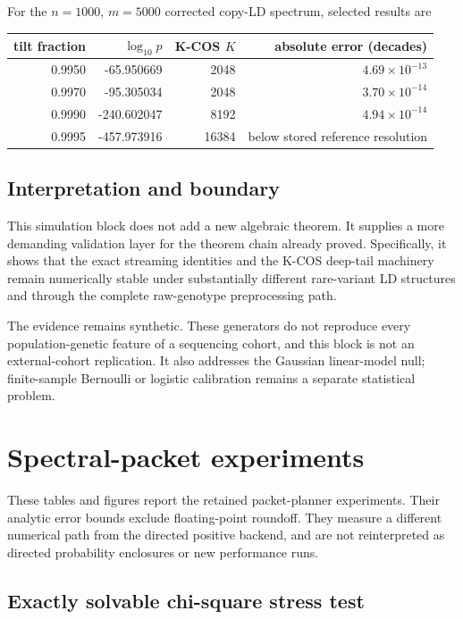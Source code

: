 For the $n=1000$, $m=5000$ corrected copy-LD spectrum, selected results are

\begin{center}
\begin{tabular}{rrrr}
\toprule
tilt fraction & $\log_{10}p$ & K-COS $K$ & absolute error (decades)\\
\midrule
0.9950 & -65.950669 & 2048 & $4.69\times10^{-13}$\\
0.9970 & -95.305034 & 2048 & $3.70\times10^{-14}$\\
0.9990 & -240.602047 & 8192 & $4.94\times10^{-14}$\\
0.9995 & -457.973916 & 16384 & below stored reference resolution\\
\bottomrule
\end{tabular}
\end{center}

\subsection{Interpretation and boundary}

This simulation block does not add a new algebraic theorem.  It supplies a
more demanding validation layer for the theorem chain already proved.
Specifically, it shows that the exact streaming identities and the K-COS
deep-tail machinery remain numerically stable under substantially different
rare-variant LD structures and through the complete raw-genotype preprocessing
path.

The evidence remains synthetic.  These generators do not reproduce every
population-genetic feature of a sequencing cohort, and this block is not an
external-cohort replication.  It also addresses the Gaussian linear-model null;
finite-sample Bernoulli or logistic calibration remains a separate statistical
problem.



\section{Spectral-packet experiments}
These tables and figures report the retained packet-planner experiments.
Their analytic error bounds exclude floating-point roundoff. They measure a
different numerical path from the directed positive backend, and are not
reinterpreted as directed probability enclosures or new performance runs.

\subsection{Exactly solvable chi-square stress test}

